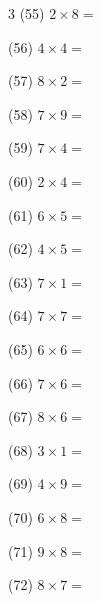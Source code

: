 \documentclass[a4paper, 11pt]{ltjsarticle}
\begin{document}
\begin{multicols*}{3}
\noindent (55) \quad $2 \times 8 =$
\vspace*{\fill}

\noindent (56) \quad $4 \times 4 =$
\vspace*{\fill}

\noindent (57) \quad $8 \times 2 =$
\vspace*{\fill}

\noindent (58) \quad $7 \times 9 =$
\vspace*{\fill}

\noindent (59) \quad $7 \times 4 =$
\vspace*{\fill}

\noindent (60) \quad $2 \times 4 =$
\vspace*{\fill}
\columnbreak

\noindent (61) \quad $6 \times 5 =$
\vspace*{\fill}

\noindent (62) \quad $4 \times 5 =$
\vspace*{\fill}

\noindent (63) \quad $7 \times 1 =$
\vspace*{\fill}

\noindent (64) \quad $7 \times 7 =$
\vspace*{\fill}

\noindent (65) \quad $6 \times 6 =$
\vspace*{\fill}

\noindent (66) \quad $7 \times 6 =$
\vspace*{\fill}

\noindent (67) \quad $8 \times 6 =$
\vspace*{\fill}

\noindent (68) \quad $3 \times 1 =$
\vspace*{\fill}

\noindent (69) \quad $4 \times 9 =$
\vspace*{\fill}

\noindent (70) \quad $6 \times 8 =$
\vspace*{\fill}

\noindent (71) \quad $9 \times 8 =$
\vspace*{\fill}

\noindent (72) \quad $8 \times 7 =$
\vspace*{\fill}

\end{multicols*}
\end{document}
